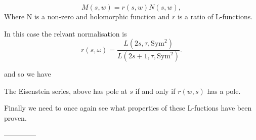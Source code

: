     \begin{Theorem}
    \[M(s, w) = r(s,w)N(s,w),\]
    Where N is a non-zero and holomorphic function and \(r\) is a ratio of L-functions.
    \end{Theorem} 

    In this case the relvant normalisation is \cite[Eq. 1.5]{ginzburgTopFourierCoefficients2021}
    \[r(s,\omega) = \frac{ L(2s, \tau, \mathrm{Sym}^2)}{L(2s+1, \tau, \mathrm{Sym}^2)} .\]

    and so we have
    \begin{Lemma}
        The Eisenstein series,  above has pole at \(s\) if and only if \(r(w,s)\) has a pole.
     \end{Lemma}
     Finally we need to once again see what properties of these L-fuctions have been proven. 

    --------------

     \begin{Theorem}
        
     \end{Theorem}


     